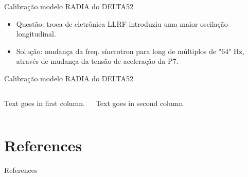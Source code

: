 \documentclass{beamer}					%
\begin{document}
\begin{frame}{Calibração modelo RADIA do DELTA52}
    \begin{itemize}
		\item<1-> Questão: troca de eletrônica LLRF introduziu uma maior oscilação longitudinal.
        \item<2-> Solução: mudança da freq. síncrotron para long de múltiplos de "64" Hz, através de mudança da tensão de aceleração da P7.
	\end{itemize}
\end{frame}

\begin{frame}{Calibração modelo RADIA do DELTA52}
	\begin{columns}
        Text goes in first column.
        
        Text goes in second column
	\end{columns}
\end{frame}

\section{References}

\begin{frame}[allowframebreaks]{References}
	\tiny
	
\end{frame}
\end{document}
